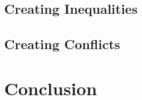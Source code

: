 \documentclass{beamer}
\begin{document}
\subsection{Creating Inequalities}

\subsection{Creating Conflicts}

\section{Conclusion}
      
\end{document}
